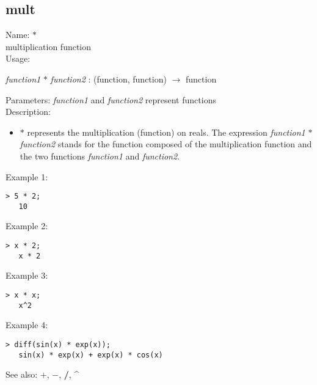 \subsection{ mult }
\noindent Name: \textbf{$*$}\\
multiplication function\\

\noindent Usage: 
\begin{center}
\emph{function1} \textbf{$*$} \emph{function2} : (\textsf{function}, \textsf{function}) $\rightarrow$ \textsf{function}\\
\end{center}
Parameters: 
\emph{function1} and \emph{function2} represent functions\\

\noindent Description: \begin{itemize}

\item \textbf{$*$} represents the multiplication (function) on reals. 
   The expression \emph{function1} \textbf{$*$} \emph{function2} stands for
   the function composed of the multiplication function and the two
   functions \emph{function1} and \emph{function2}.
\end{itemize}
\noindent Example 1: 
\begin{center}\begin{minipage}{14.8cm}\begin{Verbatim}[frame=single]
   > 5 * 2;
   10
\end{Verbatim}
\end{minipage}\end{center}
\noindent Example 2: 
\begin{center}\begin{minipage}{14.8cm}\begin{Verbatim}[frame=single]
   > x * 2;
   x * 2
\end{Verbatim}
\end{minipage}\end{center}
\noindent Example 3: 
\begin{center}\begin{minipage}{14.8cm}\begin{Verbatim}[frame=single]
   > x * x;
   x^2
\end{Verbatim}
\end{minipage}\end{center}
\noindent Example 4: 
\begin{center}\begin{minipage}{14.8cm}\begin{Verbatim}[frame=single]
   > diff(sin(x) * exp(x));
   sin(x) * exp(x) + exp(x) * cos(x)
\end{Verbatim}
\end{minipage}\end{center}
See also: \textbf{$+$}, \textbf{$-$}, \textbf{/}, \textbf{\^}

